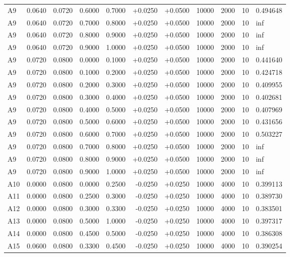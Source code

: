 \documentclass{article}
\begin{document}
\begin{longtable}{l r r r r r r r r r l}
A9 & 0.0640 & 0.0720 & 0.6000 & 0.7000 & +0.0250 & +0.0500 & 10000 & 2000 & 10 & 0.494648 \\
A9 & 0.0640 & 0.0720 & 0.7000 & 0.8000 & +0.0250 & +0.0500 & 10000 & 2000 & 10 & inf \\
A9 & 0.0640 & 0.0720 & 0.8000 & 0.9000 & +0.0250 & +0.0500 & 10000 & 2000 & 10 & inf \\
A9 & 0.0640 & 0.0720 & 0.9000 & 1.0000 & +0.0250 & +0.0500 & 10000 & 2000 & 10 & inf \\
A9 & 0.0720 & 0.0800 & 0.0000 & 0.1000 & +0.0250 & +0.0500 & 10000 & 2000 & 10 & 0.441640 \\
A9 & 0.0720 & 0.0800 & 0.1000 & 0.2000 & +0.0250 & +0.0500 & 10000 & 2000 & 10 & 0.424718 \\
A9 & 0.0720 & 0.0800 & 0.2000 & 0.3000 & +0.0250 & +0.0500 & 10000 & 2000 & 10 & 0.409955 \\
A9 & 0.0720 & 0.0800 & 0.3000 & 0.4000 & +0.0250 & +0.0500 & 10000 & 2000 & 10 & 0.402681 \\
A9 & 0.0720 & 0.0800 & 0.4000 & 0.5000 & +0.0250 & +0.0500 & 10000 & 2000 & 10 & 0.407969 \\
A9 & 0.0720 & 0.0800 & 0.5000 & 0.6000 & +0.0250 & +0.0500 & 10000 & 2000 & 10 & 0.431656 \\
A9 & 0.0720 & 0.0800 & 0.6000 & 0.7000 & +0.0250 & +0.0500 & 10000 & 2000 & 10 & 0.503227 \\
A9 & 0.0720 & 0.0800 & 0.7000 & 0.8000 & +0.0250 & +0.0500 & 10000 & 2000 & 10 & inf \\
A9 & 0.0720 & 0.0800 & 0.8000 & 0.9000 & +0.0250 & +0.0500 & 10000 & 2000 & 10 & inf \\
A9 & 0.0720 & 0.0800 & 0.9000 & 1.0000 & +0.0250 & +0.0500 & 10000 & 2000 & 10 & inf \\
A10 & 0.0000 & 0.0800 & 0.0000 & 0.2500 & -0.0250 & +0.0250 & 10000 & 4000 & 10 & 0.399113 \\
A11 & 0.0000 & 0.0800 & 0.2500 & 0.3000 & -0.0250 & +0.0250 & 10000 & 4000 & 10 & 0.389730 \\
A12 & 0.0000 & 0.0800 & 0.3000 & 0.3300 & -0.0250 & +0.0250 & 10000 & 4000 & 10 & 0.383501 \\
A13 & 0.0000 & 0.0800 & 0.5000 & 1.0000 & -0.0250 & +0.0250 & 10000 & 4000 & 10 & 0.397317 \\
A14 & 0.0000 & 0.0800 & 0.4500 & 0.5000 & -0.0250 & +0.0250 & 10000 & 4000 & 10 & 0.386308 \\
A15 & 0.0600 & 0.0800 & 0.3300 & 0.4500 & -0.0250 & +0.0250 & 10000 & 4000 & 10 & 0.390254 \\

\end{longtable}
\end{document}
